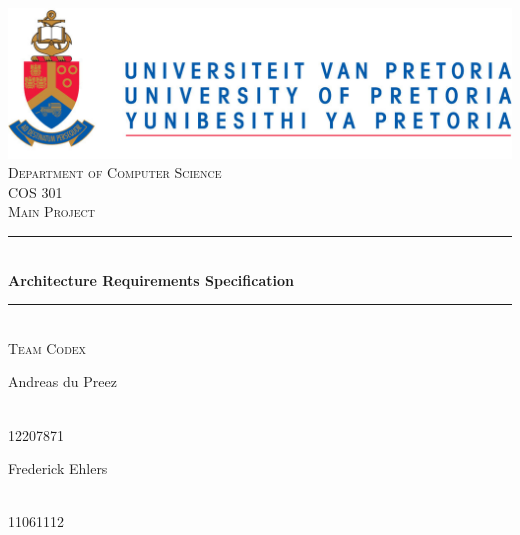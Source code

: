 \begin{titlepage}
	
	\begin{center}
		\includegraphics[width=1\textwidth]{../Images/University_of_Pretoria_Logo.PNG}\\[0.5cm]    
		\textsc{\LARGE Department of Computer Science}\\[0.5cm]
		\textsc{\Large COS 301}\\[0.5cm]
		\textsc{\Large Main Project} \nocite{ref}\\[0.75cm]
		\rule{\linewidth}{0.5mm} \\[0.4cm]
		{ \huge \bfseries Architecture Requirements Specification}\\[0.5cm]
		\rule{\linewidth}{0.5mm} \\[1cm]
		
		\textsc{\Large Team Codex}\\[1cm]		
		
		
		\begin{minipage}{0.4\textwidth}
			\begin{flushleft} \large
				Andreas {du Preez}
			\end{flushleft}
		\end{minipage}
		\begin{minipage}{0.4\textwidth}
			\begin{flushright} \large
				\emph{} \\
				12207871 
			\end{flushright}
		\end{minipage}
		
		
		\begin{minipage}{0.4\textwidth}
			\begin{flushleft} \large
				Frederick {Ehlers}
			\end{flushleft}
		\end{minipage}
		\begin{minipage}{0.4\textwidth}
			\begin{flushright} \large
				\emph{} \\
				11061112  
			\end{flushright}
		\end{minipage}
		

\end{center}
\end{titlepage}
